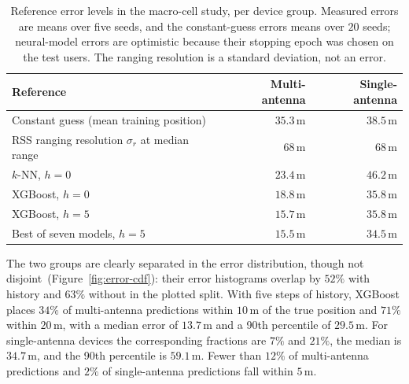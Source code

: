 \begin{table}[h]
  \centering
  \caption{Reference error levels in the macro-cell study, per device group. Measured errors are means over five seeds, and the constant-guess errors means over $20$ seeds; neural-model errors are optimistic because their stopping epoch was chosen on the test users. The ranging resolution is a standard deviation, not an error.}
  \label{tab:reference-levels}
  \small
  \begin{tabular}{@{}lrr@{}}
    \toprule
    Reference & Multi-antenna & Single-antenna \\
    \midrule
    Constant guess (mean training position) & $35.3\,\text{m}$ & $38.5\,\text{m}$ \\
    RSS ranging resolution $\sigma_r$ at median range & $68\,\text{m}$ & $68\,\text{m}$ \\
    \midrule
    $k$-NN, $h=0$ & $23.4\,\text{m}$ & $46.2\,\text{m}$ \\
    XGBoost, $h=0$ & $18.8\,\text{m}$ & $35.8\,\text{m}$ \\
    XGBoost, $h=5$ & $15.7\,\text{m}$ & $35.8\,\text{m}$ \\
    Best of seven models, $h=5$ & $15.5\,\text{m}$ & $34.5\,\text{m}$ \\
    \bottomrule
  \end{tabular}
\end{table}

The two groups are clearly separated in the error distribution, though not disjoint~(Figure~\ref{fig:error-cdf}): their error histograms overlap by $52\%$ with history and $63\%$ without in the plotted split. With five steps of history, XGBoost places $34\%$ of multi-antenna predictions within $10\,\text{m}$ of the true position and $71\%$ within $20\,\text{m}$, with a median error of $13.7\,\text{m}$ and a 90th percentile of $29.5\,\text{m}$. For single-antenna devices the corresponding fractions are $7\%$ and $21\%$, the median is $34.7\,\text{m}$, and the 90th percentile is $59.1\,\text{m}$. Fewer than $12\%$ of multi-antenna predictions and $2\%$ of single-antenna predictions fall within $5\,\text{m}$.

